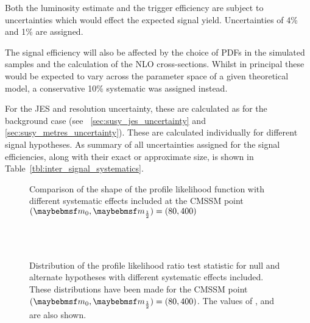 Both the luminosity estimate and the trigger efficiency are subject to
uncertainties which would effect the expected signal yield. Uncertainties of 4\%
and 1\% are assigned.

The signal efficiency will also be affected by the choice of \acp{PDF} in the
simulated samples and the calculation of the \ac{NLO} cross-sections. Whilst in
principal these would be expected to vary across the parameter space of a given
theoretical model, a conservative 10\% systematic was assigned instead.

For the \ac{JES} and \MET resolution uncertainty, these are calculated
as for the background case (see \secs~\ref{sec:susy_jes_uncertainty} and
\ref{sec:susy_metres_uncertainty}). These are calculated individually for
different signal hypotheses. As summary of all uncertainties assigned for the
signal efficiencies, along with their exact or approximate size, is shown in
Table~\ref{tbl:inter_signal_systematics}.



\begin{figure}[h!]
\centering
{}\quad
{}
\caption{Comparison of the shape of the profile likelihood function with
  different systematic effects included at the \ac{CMSSM} point $(\Mzero, \Mhalf)
  = (80, 400)$}
\label{fig:inter_pl}
\end{figure}

\begin{figure}[h!]
\centering
{}\quad
{}\\
\quad
{}\\
\caption[Distribution of the profile likelihood ratio test statistic for null
and alternate hypotheses with different systematic effects
included]{Distribution of the profile likelihood ratio test statistic for null
  and alternate hypotheses with different systematic effects included. These
  distributions have been made for the \ac{CMSSM} point $(\Mzero, \Mhalf) = (80,
  400)$. The values of \CLb, \CLspb and \CLs are also shown.}
\label{fig:inter_cls}
\end{figure}

